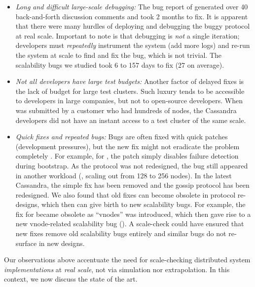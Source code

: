 \begin{itemize}
% 
\item {\em Long and difficult large-scale debugging:} 
%
The bug report of \caone generated over 40 back-and-forth discussion
comments and took 2 months to fix.  It is apparent \cite{CA-One} that
there were many hurdles of deploying and debugging the buggy protocol at
real scale.  Important to note is that debugging is {\em not} a single
iteration; developers must {\em repeatedly} instrument the system (add
more logs) and re-run the system at scale to find and fix the bug, which
is not trivial.  The scalability bugs we studied took 6 to 157 days to
fix (27 on average).


\item {\em Not all developers have large test budgets:}
%
Another factor of delayed fixes is the lack of budget for large
test clusters.  Such luxury tends to be accessible to developers 
in large companies, but not to 
open-source developers.  When
\caone was submitted by a customer who had hundreds of nodes, the
Cassandra developers did not have an instant access to a test cluster of
the same scale.



\item {\em Quick fixes and repeated bugs:} Bugs are often fixed with quick
patches (development pressures), but the new fix might not eradicate the
problem completely \cite{Yin+11-FixesBecomeBugs}.
%
For example, for \caone, the patch simply disables failure detection during
bootstrap.  As the protocol was not redesigned, the bug still appeared in
another workload (\eg, scaling out from 128 to 256 nodes).
%
In the latest Cassandra, the simple fix has been removed and the gossip
protocol has been redesigned.
%
We also found that old fixes can become obsolete in 
protocol re-designs, which then can give birth to new scalability bugs. 
%
For example, the fix for  became obsolete as ``vnodes'' was
introduced, which then gave rise to a new 
vnode-related scalability bug
().
%
A scale-check could have ensured that new fixes remove old scalability bugs
entirely and similar bugs do not re-surface in new designs.
\end{itemize}


Our observations above accentuate the need for scale-checking distributed
system {\em implementations} at {\em real scale}, not via simulation nor
extrapolation.  In this context, we now discuss the state of the art.
\fi

